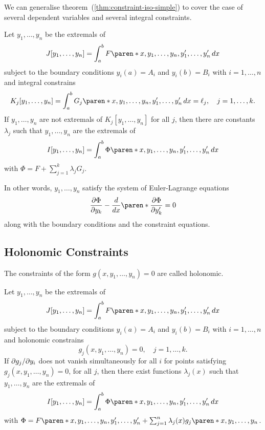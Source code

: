 \documentclass[11pt]{penrose}
\begin{document}
We can generalise theorem~(\ref{thm:constraint-iso-simple}) to cover the case of several dependent variables and several integral constraints.

\begin{nthm}
    Let $y_1, \dots, y_n$ be the extremals of
    \begin{equation}
        J[y_1, \dots, y_n] = \int_a^b F\paren*{x, y_1, \dots, y_n, y'_1, \dots, y'_n} \,dx
    \end{equation}
    subject to the boundary conditions $y_i(a) = A_i$ and $y_i(b) = B_i$ with $i=1, \dots, n$ and integral constrains
    \begin{equation}
        K_j[y_1, \dots, y_n]
        = \int_a^b G_j\paren*{x, y_1, \dots, y_n, y'_1, \dots, y'_n} \,dx
        = \ell_j,
        \quad j = 1, \dots, k.
    \end{equation}
    If $y_1, \dots, y_n$ are not extremals of $K_j[y_1, \dots, y_n]$ for all $j$, then there are constants $\lambda_j$ such that $y_1, \dots, y_n$ are the extremals of
    \begin{equation}
        I[y_1, \dots, y_n] = \int_a^b \Phi\paren*{x, y_1, \dots, y_n, y'_1, \dots, y'_n} \,dx
    \end{equation}
    with $\Phi = F + \sum_{j=1}^{k} \lambda_j G_j$.
\end{nthm}

In other words, $y_1, \dots, y_n$ satisfy the system of Euler-Lagrange equations
\begin{equation}
    \frac{\pd \Phi}{\pd y_k} - \frac{d}{dx} \paren*{\frac{\pd \Phi}{\pd y'_k}} = 0
\end{equation}
along with the boundary conditions and the constraint equations.

\subsection{Holonomic Constraints}
The constraints of the form $g(x, y_1, \dots, y_n) = 0$ are called holonomic.

\begin{nthm}
    Let $y_1, \dots, y_n$ be the extremals of
    \begin{equation}
        J[y_1, \dots, y_n] = \int_a^b F\paren*{x, y_1, \dots, y_n, y'_1, \dots, y'_n} \,dx
    \end{equation}
    subject to the boundary conditions $y_i(a) = A_i$ and $y_i(b) = B_i$ with $i=1, \dots, n$ and holonomic constrains
    \begin{equation}
        g_j(x, y_1, \dots, y_n) = 0,
        \quad j = 1, \dots, k.
    \end{equation}
    If $\partial g_j / \partial y_i$ does not vanish simultaneously for all $i$ for points satisfying $g_j(x, y_1, \dots, y_n) = 0$, for all $j$, then there exist functions $\lambda_j(x)$ such that $y_1, \dots, y_n$ are the extremals of
    \begin{equation}
        I[y_1, \dots, y_n] = \int_a^b \Phi\paren*{x, y_1, \dots, y_n, y'_1, \dots, y'_n} \,dx
    \end{equation}
    with $\Phi = F\paren*{x, y_1, \dots, y_n, y'_1, \dots, y'_n} + \sum_{j=1}^{n} \lambda_j(x) g_j \paren*{x, y_1, \dots, y_n}$.
\end{nthm}
\end{document}
